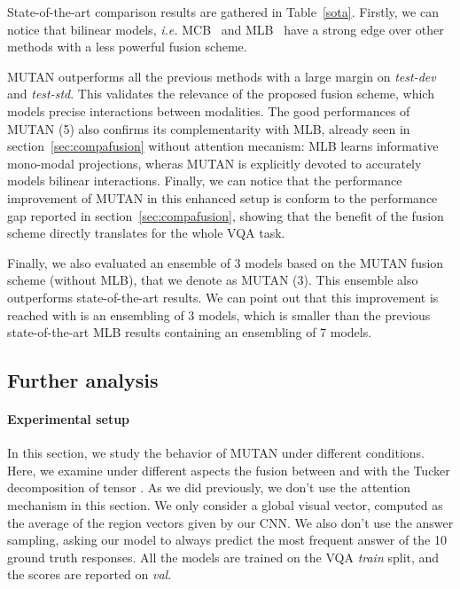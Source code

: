 \documentclass[10pt,twocolumn,letterpaper]{article}
\begin{document}
State-of-the-art comparison results are gathered in Table~\ref{sota}.
Firstly, we can notice that bilinear models, \textit{i.e.} MCB~\cite{fukui16mcb} and MLB~\cite{Kim2017} have a strong edge over other methods with a less powerful fusion scheme.

MUTAN outperforms all the previous methods with a large margin on \textit{test-dev} and \textit{test-std}.
This validates the relevance of the proposed fusion scheme, which models precise interactions between modalities. 
The good performances of MUTAN (5) also confirms its complementarity with MLB, already seen in section~\ref{sec:compafusion} without attention mecanism: 
MLB learns informative mono-modal projections, wheras MUTAN is explicitly devoted to accurately models bilinear interactions. 
Finally, we can notice that the performance improvement of MUTAN in this enhanced setup is conform to the performance gap reported in section~\ref{sec:compafusion}, 
showing that the benefit of the fusion scheme directly translates for the whole VQA task. 

Finally, we also evaluated an ensemble of 3 models based on the MUTAN fusion scheme (without MLB), that we denote as MUTAN (3). This ensemble also outperforms state-of-the-art results. We can point out that this improvement is reached with is an ensembling of 3 models, 
which is smaller than the previous state-of-the-art MLB results containing an ensembling of 7 models. 


 \subsection{Further analysis}

\paragraph{Experimental setup}
In this section, we study the behavior of MUTAN under different conditions. Here, we examine under different aspects the fusion between  and  with the Tucker decomposition of tensor . As we did previously, we don't use the attention mechanism in this section. We only consider a global visual vector, computed as the average of the  region vectors given by our CNN. We also don't use the answer sampling, asking our model to always predict the most frequent answer of the 10 ground truth responses. All the models are trained on the VQA \textit{train} split, and the scores are reported on \textit{val}.
\vspace{-0.3cm}
\end{document}

